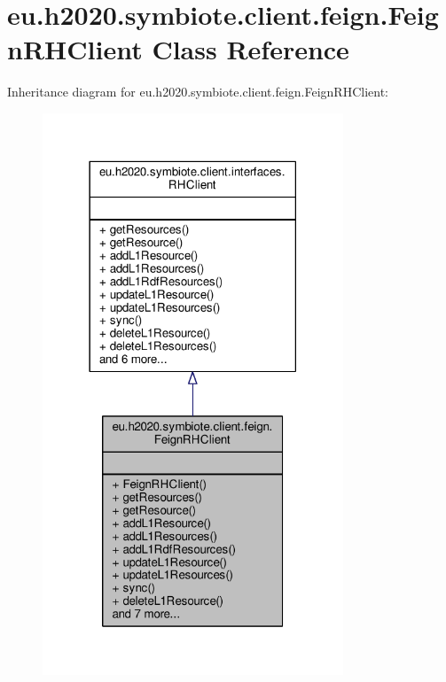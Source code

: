 \hypertarget{classeu_1_1h2020_1_1symbiote_1_1client_1_1feign_1_1FeignRHClient}{}\section{eu.\+h2020.\+symbiote.\+client.\+feign.\+Feign\+R\+H\+Client Class Reference}
\label{classeu_1_1h2020_1_1symbiote_1_1client_1_1feign_1_1FeignRHClient}


Inheritance diagram for eu.\+h2020.\+symbiote.\+client.\+feign.\+Feign\+R\+H\+Client\+:\nopagebreak
\begin{figure}[H]
\begin{center}
\leavevmode
\includegraphics[width=254pt]{classeu_1_1h2020_1_1symbiote_1_1client_1_1feign_1_1FeignRHClient__inherit__graph}
\end{center}
\end{figure}


